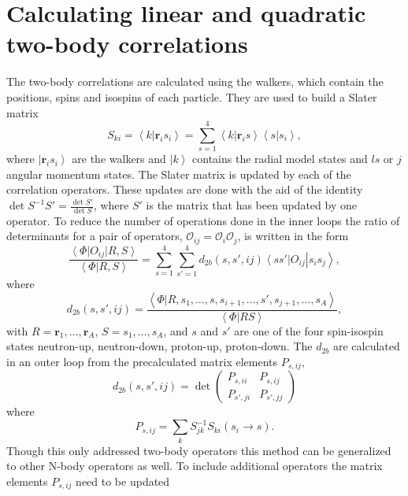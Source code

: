 \documentclass[aps,prc,twocolumn,superscriptaddress,showpacs,floatfix,nofootinbib]{revtex4-1}
\begin{document}
\section{Calculating linear and quadratic two-body correlations}
The two-body correlations are calculated using the walkers, which contain the positions, spins and isospins of each particle. They are used to build a Slater matrix
\begin{equation}
   S_{ki} = \left<k|\mathbf{r}_i s_i\right> = \sum\limits_{s=1}^4\left<k|\mathbf{r}_i s\right>\left<s|s_i\right>,
\end{equation}
where $\left|\mathbf{r}_i s_i\right>$ are the walkers and $\left|k\right>$ contains the radial model states and $ls$ or $j$ angular momentum states. The Slater matrix is updated by each of the correlation operators. These updates are done with the aid of the identity $\det S^{-1}S' = \frac{\det S'}{\det S}$, where $S'$ is the matrix that has been updated by one operator. To reduce the number of operations done in the inner loops the ratio of determinants for a pair of operators, $\mathcal{O}_{ij}=\mathcal{O}_i\mathcal{O}_j$, is written in the form
\begin{equation}
   \frac{\left<\Phi\right|O_{ij}\left|R,S\right>}{\left<\Phi|R,S\right>} = \sum\limits_{s=1}^4\sum\limits_{s'=1}^4 d_{2b}(s,s',ij)\left<ss'\right|O_{ij}\left|s_is_j\right>,
\end{equation}
where
\begin{equation}
   d_{2b}(s,s',ij)=\frac{\left<\Phi|R,s_1,\ldots,s,s_{i+1},\ldots,s',s_{j+1},\ldots,s_A\right>}{\left<\Phi|RS\right>},
\end{equation}
with $R=\mathbf{r}_1,\ldots,\mathbf{r}_A$, $S=s_1,\ldots,s_A$, and $s$ and $s'$ are one of the four spin-isospin states neutron-up, neutron-down, proton-up, proton-down. The $d_{2b}$ are calculated in an outer loop from the precalculated matrix elements $P_{s,ij}$,
\begin{equation}
   d_{2b}(s,s',ij) = \det\begin{pmatrix}P_{s,ii} & P_{s,ij} \\ P_{s',ji} & P_{s',jj}\end{pmatrix}
\end{equation}
where
\begin{equation}
   P_{s,ij}=\sum\limits_k S^{-1}_{jk}S_{ki}(s_i\rightarrow s).
\end{equation}
Though this only addressed two-body operators this method can be generalized to other N-body operators as well. To include additional operators the matrix elements $P_{s,ij}$ need to be updated
\end{document}
